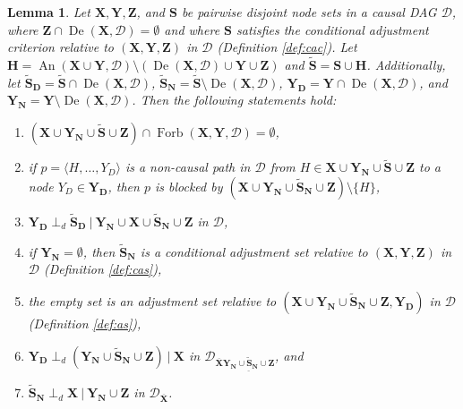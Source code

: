 \documentclass[twoside]{article}
\newtheorem{lemma}[theorem]{Lemma}
\DeclareMathOperator{\An}{An}
\DeclareMathOperator{\De}{De}
\DeclareMathOperator{\Forb}{Forb}
\newcommand{\fb}[2][X,Y]{\Forb(\mb{#1},#2)}
\newcommand\given[1][]{\:#1\vert\:}
\newcommand{\mb}[1]{\mathbf{#1}}
\newcommand{\dsepp}{\perp_{d}}
\newcommand{\g}[1][G]{\mathcal{#1}}
\begin{document}

\begin{lemma} 
\label{lem:sound-setup2}
    Let $\mb{X},\mb{Y}, \mb{Z}$, and $\mb{S}$ be pairwise disjoint node sets in a causal DAG $\g[D]$, where $\mb{Z} \cap \De(\mb{X}, \g[D]) = \emptyset$ and where $\mb{S}$ satisfies the conditional adjustment criterion relative to $(\mb{X,Y,Z})$ in $\g[D]$ (Definition \ref{def:cac}). Let $\mb{H} = \An(\mb{X} \cup \mb{Y},\g[D]) \setminus (\De(\mb{X}, \g[D]) \cup \mb{Y} \cup \mb{Z})$ and $\mb{\tilde{S}} = \mb{S} \cup \mb{H}$. Additionally, let $\mb{\tilde{S}_D} = \mb{\tilde{S}} \cap \De(\mb{X}, \g[D])$, $\mb{\tilde{S}_N} = \mb{\tilde{S}} \setminus \De(\mb{X}, \g[D])$, $\mb{Y_D} = \mb{Y} \cap \De(\mb{X},\g[D])$, and $\mb{Y_N} = \mb{Y} \setminus \De(\mb{X}, \g[D])$. Then the following statements hold:
    \begin{enumerate}[label=(\roman*)] 

        \item\label{lem:sound-setup2-1} $(\mb{X} \cup \mb{Y_N} \cup \mb{\tilde{S}} \cup \mb{Z}) \cap \fb{\g[D]} = \emptyset$,

        \item\label{lem:sound-setup2-2} if $p = \langle H, \dots, Y_D \rangle$ is a non-causal path in $\g[D]$ from $H \in \mb{X} \cup \mb{Y_N} \cup \mb{\tilde{S}} \cup \mb{Z}$ to a node $Y_D \in \mb{Y_D}$, then $p$ is blocked by $(\mb{X} \cup \mb{Y_N} \cup \mb{\tilde{S}_N} \cup \mb{Z}) \setminus \{H\}$,

        \item \label{lem:sound-setup2-3} $\mb{Y_D} \dsepp \mb{\tilde{S}_D} \given \mb{Y_N} \cup \mb{X} \cup \mb{\tilde{S}_N} \cup \mb{Z}$ in $\g[D]$,

        \item \label{lem:sound-setup2-4} if $\mb{Y_N} = \emptyset$, then $\mb{\tilde{S}_N}$ is a conditional adjustment set relative to $(\mb{X,Y,Z})$ in $\g[D]$ (Definition \ref{def:cas}),

        \item \label{lem:sound-setup2-5} the empty set is an adjustment set relative to $(\mb{X} \cup \mb{Y_N} \cup \mb{\tilde{S}_N} \cup \mb{Z}, \mb{Y_D})$ in $\g[D]$ (Definition \ref{def:as}),

        \item \label{lem:sound-setup2-6} $\mb{Y_D} \dsepp (\mb{Y_N} \cup \mb{\tilde{S}_N} \cup \mb{Z}) \given \mb{X}$ in $\g[D]_{\overline{\mb{X}}\underline{\mb{Y_N} \cup  \mb{\tilde{S}_N} \cup \mb{Z}}}$, and

        \item \label{lem:sound-setup2-7} $\mb{\tilde{S}_N} \dsepp \mb{X} \given \mb{Y_N} \cup \mb{Z}$ in $\g[D]_{\overline{\mb{X}}}$.
    \end{enumerate}
\end{lemma}
\end{document}
